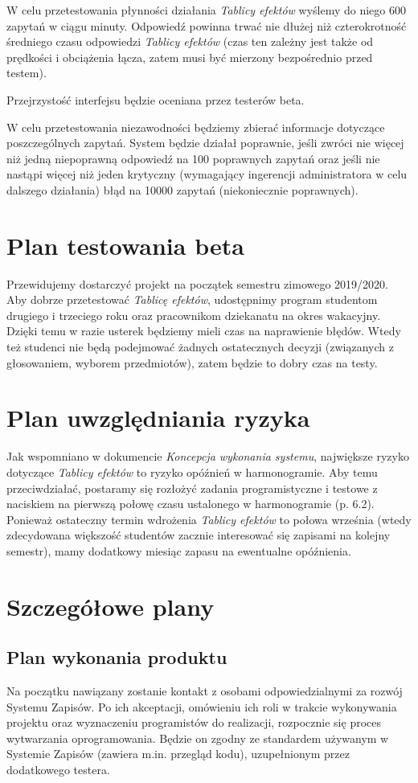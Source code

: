\documentclass{article}
\begin{document}
W celu przetestowania płynności działania \textit{Tablicy efektów} wyślemy do niego 600 zapytań w ciągu minuty.
Odpowiedź powinna trwać nie dłużej niż czterokrotność średniego czasu odpowiedzi \textit{Tablicy efektów} (czas ten zależny jest także od prędkości i obciążenia łącza, zatem musi być mierzony bezpośrednio przed testem).

Przejrzystość interfejsu będzie oceniana przez testerów beta.

W celu przetestowania niezawodności będziemy zbierać informacje dotyczące poszczególnych zapytań.
System będzie działał poprawnie, jeśli zwróci nie więcej niż jedną niepoprawną odpowiedź na 100 poprawnych zapytań oraz jeśli nie nastąpi więcej niż jeden krytyczny (wymagający ingerencji administratora w celu dalszego działania) błąd na 10000 zapytań (niekoniecznie poprawnych).

\section{Plan testowania beta}
Przewidujemy dostarczyć projekt na początek semestru zimowego 2019/2020.
Aby dobrze przetestować \textit{Tablicę efektów}, udostępnimy program studentom drugiego i trzeciego roku oraz pracownikom dziekanatu na okres wakacyjny.
Dzięki temu w razie usterek będziemy mieli czas na naprawienie błędów.
Wtedy też studenci nie będą podejmować żadnych ostatecznych decyzji (związanych z głosowaniem, wyborem przedmiotów), zatem będzie to dobry czas na testy.

\section{Plan uwzględniania ryzyka}
Jak wspomniano w dokumencie \textit{Koncepcja wykonania systemu}, największe ryzyko dotyczące \textit{Tablicy efektów} to ryzyko opóźnień w harmonogramie.
Aby temu przeciwdziałać, postaramy się rozłożyć zadania programistyczne i testowe z naciskiem na pierwszą połowę czasu ustalonego w harmonogramie (p. 6.2).
Ponieważ ostateczny termin wdrożenia \textit{Tablicy efektów} to połowa września (wtedy zdecydowana większość studentów zacznie interesować się zapisami na kolejny semestr), mamy dodatkowy miesiąc zapasu na ewentualne opóźnienia.

\section{Szczegółowe plany}
\subsection{Plan wykonania produktu}
Na początku nawiązany zostanie kontakt z osobami odpowiedzialnymi za rozwój Systemu Zapisów.
Po ich akceptacji, omówieniu ich roli w trakcie wykonywania projektu oraz wyznaczeniu programistów do realizacji, rozpocznie się proces wytwarzania oprogramowania.
Będzie on zgodny ze standardem używanym w Systemie Zapisów (zawiera m.in. przegląd kodu), uzupełnionym przez dodatkowego testera.
\end{document}
